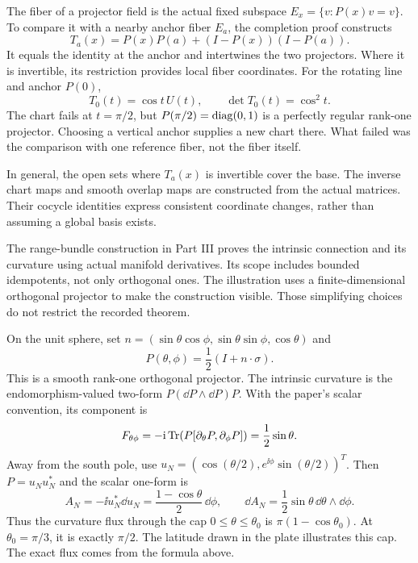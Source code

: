 The fiber of a projector field is the actual fixed subspace $E_x=\{v:P(x)v=v\}$. To compare it with a nearby anchor fiber $E_a$, the completion proof constructs
\[
T_a(x)=P(x)P(a)+(I-P(x))(I-P(a)).
\]
It equals the identity at the anchor and intertwines the two projectors. Where it is invertible, its restriction provides local fiber coordinates.
For the rotating line and anchor $P(0)$,
\[
T_0(t)=\cos t\,U(t),\qquad \det T_0(t)=\cos^2t.
\]
The chart fails at $t=\pi/2$, but $P(\pi/2)=\operatorname{diag}(0,1)$ is a perfectly regular rank-one projector. Choosing a vertical anchor supplies a new chart there. What failed was the comparison with one reference fiber, not the fiber itself.

In general, the open sets where $T_a(x)$ is invertible cover the base. The inverse chart maps and smooth overlap maps are constructed from the actual matrices. Their cocycle identities express consistent coordinate changes, rather than assuming a global basis exists.

The range-bundle construction in Part III proves the intrinsic connection and its curvature using actual manifold derivatives. Its scope includes bounded idempotents, not only orthogonal ones. The illustration uses a finite-dimensional orthogonal projector to make the construction visible. Those simplifying choices do not restrict the recorded theorem.

On the unit sphere, set $n=(\sin\theta\cos\phi,\sin\theta\sin\phi,\cos\theta)$ and
\[
P(\theta,\phi)=\frac12(I+n\cdot\sigma).
\]
This is a smooth rank-one orthogonal projector. The intrinsic curvature is the endomorphism-valued two-form $P(\dd P\wedge\dd P)P$. With the paper's scalar convention, its component is
\[
F_{\theta\phi}=-\ii\Tr\!\left(P[\partial_\theta P,\partial_\phi P]\right)
=\frac12\sin\theta.
\]
Away from the south pole, use $u_N=(\cos(\theta/2),e^{\ii\phi}\sin(\theta/2))^T$. Then $P=u_Nu_N^*$ and the scalar one-form is
\[
A_N=-\ii u_N^*\dd u_N=\frac{1-\cos\theta}{2}\,\dd\phi,
\qquad \dd A_N=\frac12\sin\theta\,\dd\theta\wedge\dd\phi.
\]
Thus the curvature flux through the cap $0\le\theta\le\theta_0$ is $\pi(1-\cos\theta_0)$. At $\theta_0=\pi/3$, it is exactly $\pi/2$. The latitude drawn in the plate illustrates this cap. The exact flux comes from the formula above.

